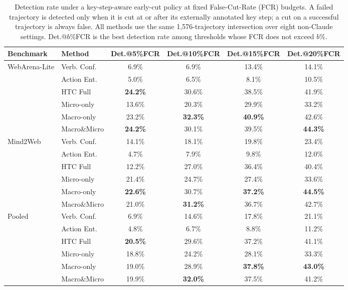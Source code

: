 \begin{table}[t]
\centering
\small
\setlength{\tabcolsep}{4pt}
\renewcommand{\arraystretch}{1.08}
\begin{tabular}{llcccc}
\toprule
\textbf{Benchmark} & \textbf{Method} & \textbf{Det.@5\%FCR} & \textbf{Det.@10\%FCR} & \textbf{Det.@15\%FCR} & \textbf{Det.@20\%FCR} \\
\midrule
\multirow{6}{*}{WebArena-Lite} & Verb. Conf. & 6.9\% & 6.9\% & 13.4\% & 14.1\% \\
 & Action Ent. & 5.0\% & 6.5\% & 8.1\% & 10.5\% \\
 & HTC Full & \textbf{24.2\%} & 30.6\% & 38.5\% & 41.9\% \\
 & Micro-only & 13.6\% & 20.3\% & 29.9\% & 33.2\% \\
 & Macro-only & 23.2\% & \textbf{32.3\%} & \textbf{40.9\%} & 42.6\% \\
 & Macro\&Micro & \textbf{24.2\%} & 30.1\% & 39.5\% & \textbf{44.3\%} \\
\midrule
\multirow{6}{*}{Mind2Web} & Verb. Conf. & 14.1\% & 18.1\% & 19.8\% & 23.4\% \\
 & Action Ent. & 4.7\% & 7.9\% & 9.8\% & 12.0\% \\
 & HTC Full & 12.2\% & 27.0\% & 36.4\% & 40.4\% \\
 & Micro-only & 21.4\% & 24.7\% & 27.4\% & 33.6\% \\
 & Macro-only & \textbf{22.6\%} & 30.7\% & \textbf{37.2\%} & \textbf{44.5\%} \\
 & Macro\&Micro & 21.0\% & \textbf{31.2\%} & 36.7\% & 42.7\% \\
\midrule
\multirow{6}{*}{Pooled} & Verb. Conf. & 6.9\% & 14.6\% & 17.8\% & 21.1\% \\
 & Action Ent. & 4.8\% & 6.7\% & 8.8\% & 11.2\% \\
 & HTC Full & \textbf{20.5\%} & 29.6\% & 37.2\% & 41.1\% \\
 & Micro-only & 18.8\% & 24.2\% & 28.1\% & 33.3\% \\
 & Macro-only & 19.0\% & 28.9\% & \textbf{37.8\%} & \textbf{43.0\%} \\
 & Macro\&Micro & 19.9\% & \textbf{32.0\%} & 37.5\% & 41.2\% \\
\bottomrule
\end{tabular}
\caption{Detection rate under a key-step-aware early-cut policy at fixed False-Cut-Rate (FCR) budgets. A failed trajectory is detected only when it is cut at or after its externally annotated key step; a cut on a successful trajectory is always false. All methods use the same 1,576-trajectory intersection over eight non-Claude settings. Det.@$b$\%FCR is the best detection rate among thresholds whose FCR does not exceed $b\%$.}
\label{tab:early_cut}
\end{table}
